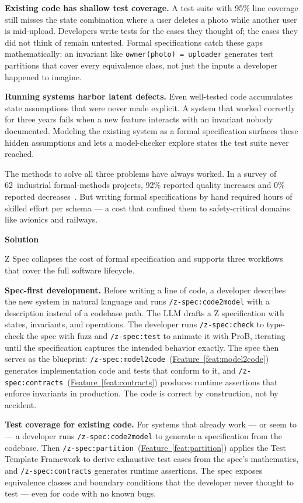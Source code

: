 \documentclass[11pt,letterpaper]{article}
\newcommand{\prsection}[1]{%
  \vspace{1em}%
  {\large\bfseries\color{SectionBlue}#1}%
  \vspace{0.3em}\par%
}
\newcommand{\featureref}[1]{\hyperref[#1]{Feature~\ref*{#1}}}
\begin{document}
\textbf{Existing code has shallow test coverage.} A test suite with 95\% line coverage still misses the state combination where a user deletes a photo while another user is mid-upload. Developers write tests for the cases they thought of; the cases they did not think of remain untested. Formal specifications catch these gaps mathematically: an invariant like \texttt{owner(photo) = uploader} generates test partitions that cover every equivalence class, not just the inputs a developer happened to imagine.

\textbf{Running systems harbor latent defects.} Even well-tested code accumulates state assumptions that were never made explicit. A system that worked correctly for three years fails when a new feature interacts with an invariant nobody documented. Modeling the existing system as a formal specification surfaces these hidden assumptions and lets a model-checker explore states the test suite never reached.

The methods to solve all three problems have always worked. In a survey of 62~industrial formal-methods projects, 92\% reported quality increases and 0\% reported decreases~\cite{woodcock2009fmsurvey}. But writing formal specifications by hand required hours of skilled effort per schema --- a cost that confined them to safety-critical domains like avionics and railways.

\prsection{Solution}

Z Spec collapses the cost of formal specification and supports three workflows that cover the full software lifecycle.

\textbf{Spec-first development.} Before writing a line of code, a developer describes the new system in natural language and runs
{\small\texttt{/z-spec:code2model}} with a description instead of a codebase path. The LLM drafts a Z specification with states, invariants, and operations. The developer runs
{\small\texttt{/z-spec:check}} to type-check the spec with fuzz and
{\small\texttt{/z-spec:test}} to animate it with ProB, iterating until the specification captures the intended behavior exactly. The spec then serves as the blueprint: {\small\texttt{/z-spec:model2code}}~(\featureref{feat:model2code}) generates implementation code and tests that conform to it, and {\small\texttt{/z-spec:contracts}}~(\featureref{feat:contracts}) produces runtime assertions that enforce invariants in production. The code is correct by construction, not by accident.

\textbf{Test coverage for existing code.} For systems that already work --- or seem to --- a developer runs
{\small\texttt{/z-spec:code2model}} to generate a specification from the codebase. Then
{\small\texttt{/z-spec:partition}}~(\featureref{feat:partition}) applies the Test Template Framework to derive exhaustive test cases from the spec's mathematics, and
{\small\texttt{/z-spec:contracts}} generates runtime assertions. The spec exposes equivalence classes and boundary conditions that the developer never thought to test --- even for code with no known bugs.
\end{document}
